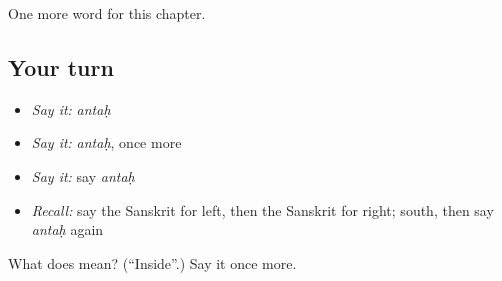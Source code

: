 \begin{grammarlens}[title={What you've built}]
One more word for this chapter.
\end{grammarlens}

\subsection*{Your turn}
\begin{itemize}
\raggedright
  \item \emph{Say it:} \emph{antaḥ}
  \item \emph{Say it:} \emph{antaḥ}, once more
  \item \emph{Say it:} say \emph{antaḥ}
  \item \emph{Recall:} say the Sanskrit for left, then the Sanskrit for right; south, then say \emph{antaḥ} again
\end{itemize}

\begin{tcolorbox}[breakable,colback=teal!4,colframe=teal!35!black,title={Before you move on}]
What does  mean? (\textquotedblleft{}Inside\textquotedblright{}.) Say it once more.
\end{tcolorbox}
